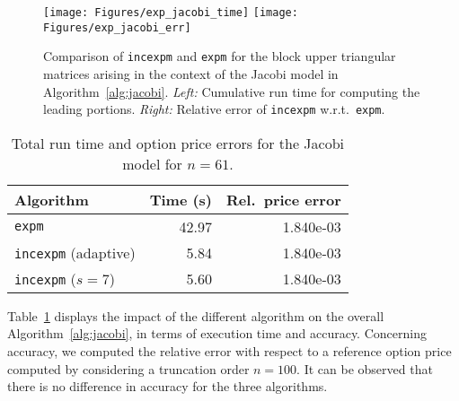 \begin{figure}[t]
    \centering
    \texttt{[image: Figures/exp\_jacobi\_time]}
    \hfill
    \texttt{[image: Figures/exp\_jacobi\_err]}
    \caption{Comparison of \texttt{incexpm} and \texttt{expm} for the block upper triangular matrices arising in the context of the Jacobi model in Algorithm~\ref{alg:jacobi}.
    \emph{Left:} Cumulative run time for computing the leading
    portions. \emph{Right:} Relative error of \texttt{incexpm}
    w.r.t.~\texttt{expm}. \label{fig:exp_jacobi}}
\end{figure}

\begin{table}[t]
    \centering
    \caption{Total run time and option price errors for the
    Jacobi model for $n = 61$. \label{table_jacobi} }
    \begin{tabular}{l|r|r}
        Algorithm & Time (s) & Rel.~price error\\  \hline
        \texttt{expm}               &42.97 & 1.840e-03\\
        \texttt{incexpm} (adaptive) & 5.84 & 1.840e-03\\
        \texttt{incexpm} ($s=7$)    & 5.60 & 1.840e-03\\
    \end{tabular}
\end{table}

Table~\ref{table_jacobi} displays the impact of the different algorithm on the overall Algorithm~\ref{alg:jacobi}, in terms of execution time and accuracy. Concerning accuracy, we computed the relative error with respect to a reference option price computed by considering a truncation order $n = 100$.  It can be observed that there is no difference in accuracy 
for the three algorithms.

